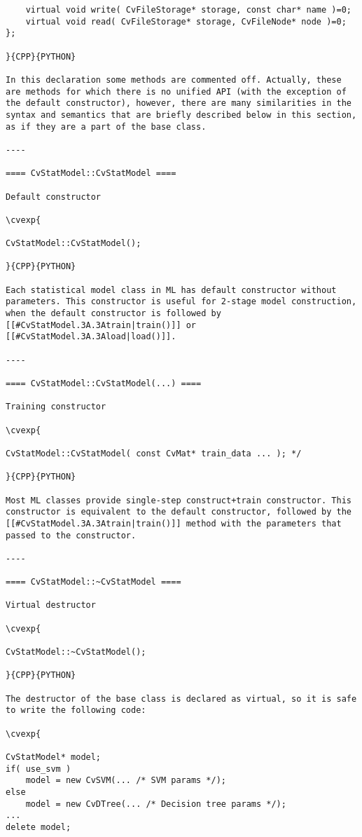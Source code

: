 \begin{verbatim}
    virtual void write( CvFileStorage* storage, const char* name )=0;
    virtual void read( CvFileStorage* storage, CvFileNode* node )=0;
};

}{CPP}{PYTHON}

In this declaration some methods are commented off. Actually, these are methods for which there is no unified API (with the exception of the default constructor), however, there are many similarities in the syntax and semantics that are briefly described below in this section, as if they are a part of the base class.

----

==== CvStatModel::CvStatModel ====

Default constructor

\cvexp{

CvStatModel::CvStatModel();

}{CPP}{PYTHON}

Each statistical model class in ML has default constructor without parameters. This constructor is useful for 2-stage model construction, when the default constructor is followed by [[#CvStatModel.3A.3Atrain|train()]] or [[#CvStatModel.3A.3Aload|load()]].

----

==== CvStatModel::CvStatModel(...) ====

Training constructor

\cvexp{

CvStatModel::CvStatModel( const CvMat* train_data ... ); */

}{CPP}{PYTHON}

Most ML classes provide single-step construct+train constructor. This constructor is equivalent to the default constructor, followed by the [[#CvStatModel.3A.3Atrain|train()]] method with the parameters that passed to the constructor.

----

==== CvStatModel::~CvStatModel ====

Virtual destructor

\cvexp{

CvStatModel::~CvStatModel();

}{CPP}{PYTHON}

The destructor of the base class is declared as virtual, so it is safe to write the following code:

\cvexp{

CvStatModel* model;
if( use_svm )
    model = new CvSVM(... /* SVM params */);
else
    model = new CvDTree(... /* Decision tree params */);
...
delete model;


\end{verbatim}
